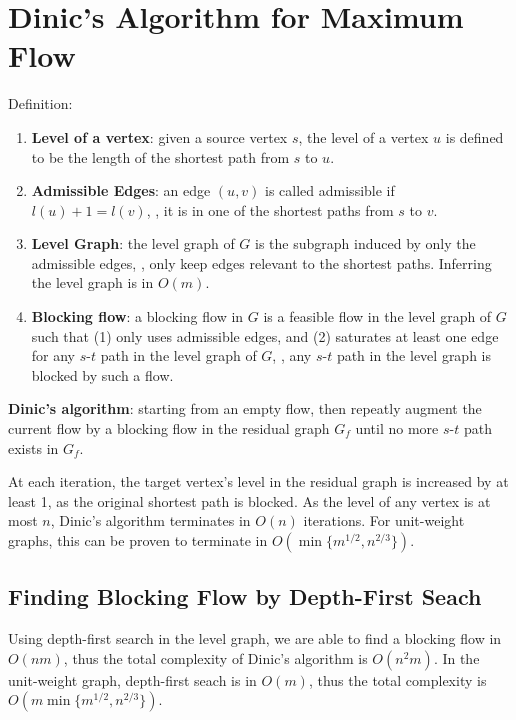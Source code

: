 \section{Dinic's Algorithm for Maximum Flow}

Definition:
\begin{enumerate}
    \item \textbf{Level of a vertex}: given a source vertex $s$, the level of a vertex $u$ is defined to be the length of the shortest path from $s$ to $u$.
    \item \textbf{Admissible Edges}: an edge $(u, v)$ is called admissible if $l(u)+1=l(v)$, \ie, it is in one of the shortest paths from $s$ to $v$.
    \item \textbf{Level Graph}: the level graph of $G$ is the subgraph induced by only the admissible edges, \ie, only keep edges relevant to the shortest paths. Inferring the level graph is in $O(m)$.
    \item \textbf{Blocking flow}: a blocking flow in $G$ is a feasible flow in the level graph of $G$ such that (1) only uses admissible edges, and (2) saturates at least one edge for any $s$-$t$ path in the level graph of $G$, \ie, any $s$-$t$ path in the level graph is blocked by such a flow.
\end{enumerate}

\textbf{Dinic's algorithm}: starting from an empty flow, then repeatly augment the current flow by a blocking flow in the residual graph $G_f$ until no more $s$-$t$ path exists in $G_f$.

At each iteration, the target vertex's level in the residual graph is increased by at least 1, as the original shortest path is blocked. As the level of any vertex is at most $n$, Dinic's algorithm terminates in $O(n)$ iterations. For unit-weight graphs, this can be proven to terminate in $O(\min\{m^{1/2}, n^{2/3}\})$.

\subsection{Finding Blocking Flow by Depth-First Seach}

Using depth-first search in the level graph, we are able to find a blocking flow in $O(nm)$, thus the total complexity of Dinic's algorithm is $O(n^2 m)$. In the unit-weight graph, depth-first seach is in $O(m)$, thus the total complexity is $O(m \min\{m^{1/2}, n^{2/3}\})$.